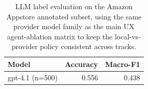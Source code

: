 \begin{table}[t]
\centering
\small
\caption{LLM label evaluation on the Amazon Appstore annotated subset, using the same provider model family as the main UX agent-ablation matrix to keep the local-vs-provider policy consistent across tracks.}
\label{tab:appstore-eval}
\begin{tabular}{lrr}
\toprule
Model & Accuracy & Macro-F1 \\
\midrule
gpt-4.1 (n=500) & 0.556 & 0.438 \\
\bottomrule
\end{tabular}
\end{table}
